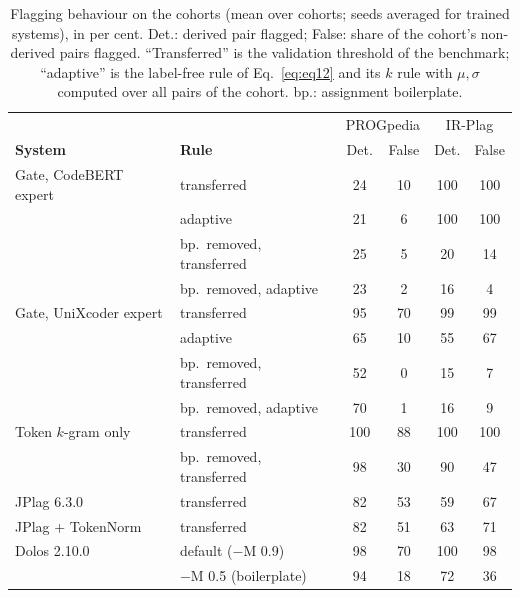 \begin{table}[t]
\centering
\caption{Flagging behaviour on the cohorts (mean over cohorts; seeds averaged for trained systems), in per cent. Det.: derived pair flagged; False: share of the cohort's non-derived pairs flagged. ``Transferred'' is the validation threshold of the benchmark; ``adaptive'' is the label-free rule of Eq.~\ref{eq:eq12} and its $k$ rule with $\mu,\sigma$ computed over all pairs of the cohort. bp.: assignment boilerplate.}
\label{tab:cohort-thr}
\footnotesize
\setlength{\tabcolsep}{3pt}
\begin{tabular}{ll|cc|cc}
\toprule
 & & \multicolumn{2}{c|}{PROGpedia} & \multicolumn{2}{c}{IR-Plag} \\
\textbf{System} & \textbf{Rule} & Det. & False & Det. & False \\
\midrule
Gate, CodeBERT expert & transferred & 24 & 10 & 100 & 100 \\
 & adaptive & 21 & 6 & 100 & 100 \\
 & bp.\ removed, transferred & 25 & 5 & 20 & 14 \\
 & bp.\ removed, adaptive & 23 & 2 & 16 & 4 \\
\midrule
Gate, UniXcoder expert & transferred & 95 & 70 & 99 & 99 \\
 & adaptive & 65 & 10 & 55 & 67 \\
 & bp.\ removed, transferred & 52 & 0 & 15 & 7 \\
 & bp.\ removed, adaptive & 70 & 1 & 16 & 9 \\
\midrule
Token $k$-gram only & transferred & 100 & 88 & 100 & 100 \\
 & bp.\ removed, transferred & 98 & 30 & 90 & 47 \\
\midrule
JPlag 6.3.0 & transferred & 82 & 53 & 59 & 67 \\
JPlag + TokenNorm & transferred & 82 & 51 & 63 & 71 \\
\midrule
Dolos 2.10.0 & default ($-$M 0.9) & 98 & 70 & 100 & 98 \\
 & $-$M 0.5 (boilerplate) & 94 & 18 & 72 & 36 \\
\bottomrule
\end{tabular}
\end{table}